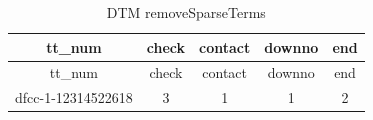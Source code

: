 \documentclass[]{article}
\begin{document}
\begin{longtable}[c]{@{}ccccc@{}}
\caption{DTM removeSparseTerms}\tabularnewline
\toprule
\begin{minipage}[b]{0.23\columnwidth}\centering\strut
tt\_num
\strut\end{minipage} &
\begin{minipage}[b]{0.10\columnwidth}\centering\strut
check
\strut\end{minipage} &
\begin{minipage}[b]{0.12\columnwidth}\centering\strut
contact
\strut\end{minipage} &
\begin{minipage}[b]{0.11\columnwidth}\centering\strut
downno
\strut\end{minipage} &
\begin{minipage}[b]{0.06\columnwidth}\centering\strut
end
\strut\end{minipage}\tabularnewline
\midrule
\endfirsthead
\toprule
\begin{minipage}[b]{0.23\columnwidth}\centering\strut
tt\_num
\strut\end{minipage} &
\begin{minipage}[b]{0.10\columnwidth}\centering\strut
check
\strut\end{minipage} &
\begin{minipage}[b]{0.12\columnwidth}\centering\strut
contact
\strut\end{minipage} &
\begin{minipage}[b]{0.11\columnwidth}\centering\strut
downno
\strut\end{minipage} &
\begin{minipage}[b]{0.06\columnwidth}\centering\strut
end
\strut\end{minipage}\tabularnewline
\midrule
\endhead
\begin{minipage}[t]{0.23\columnwidth}\centering\strut
dfcc-1-12314522618
\strut\end{minipage} &
\begin{minipage}[t]{0.10\columnwidth}\centering\strut
3
\strut\end{minipage} &
\begin{minipage}[t]{0.12\columnwidth}\centering\strut
1
\strut\end{minipage} &
\begin{minipage}[t]{0.11\columnwidth}\centering\strut
1
\strut\end{minipage} &
\begin{minipage}[t]{0.06\columnwidth}\centering\strut
2
\strut\end{minipage}\tabularnewline

\end{longtable}
\end{document}
